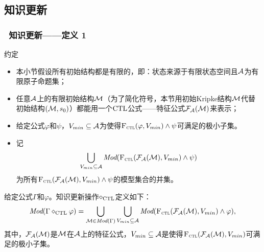 \documentclass[9pt, CJK]{beamer}
\begin{document}
\subsection{知识更新}
\begin{frame}
	\frametitle{~知识更新——{\footnotesize 定义 1}}
	{\footnotesize
		\begin{block}{约定}
			\begin{itemize}
				\item 本小节假设所有初始结构都是有限的，即：状态来源于有限状态空间且${\cal A}$为有限原子命题集；
				\item 任意${\cal A}$上的有限初始结构${\cal M}$（为了简化符号，本节用初始Kripke结构${\cal M}$代替初始结构$({\cal M},s_0)$）都能用一个$\textrm{CTL}$公式——特征公式${\cal F}_{{\cal A}}({\cal M})$来表示；
				\item 给定公式$\varphi$和$\psi$，$V_{min}\subseteq {\cal A}$为使得${\textsc{F}_{\textsc{ctl}}}(\varphi, V_{min}) \wedge \psi$可满足的极小子集。
				\item 记
				$$\bigcup_{V_{min}\subseteq {\cal A}} \textit{Mod}({\textsc{F}_{\textsc{ctl}}}({\cal F}_{{\cal A}}({\cal M}), V_{min}) \wedge \psi)$$  
				为所有${\textsc{F}_{\textsc{ctl}}}({\cal F}_{{\cal A}}({\cal M}), V_{min}) \wedge \psi$的模型集合的并集。
			\end{itemize}
		\end{block}
	
	\begin{definition}\label{def:KU}
		给定公式$\Gamma$和$\varphi$。知识更新操作$\diamond_{\textrm{CTL}}$定义如下：
		\[
		\textit{Mod}(\Gamma \diamond_{\textrm{CTL}} \varphi) = \bigcup_{{\cal M} \in \textit{Mod}(\Gamma)} \bigcup_{V_{min}\subseteq {\cal A}} \textit{Mod}({\textsc{F}_{\textsc{ctl}}}({\cal F}_{{\cal A}}({\cal M}), V_{min}) \wedge \varphi),
		\]
		其中，${\cal F}_{{\cal A}}({\cal M})$是${\cal M}$在${\cal A}$上的特征公式，$V_{min} \subseteq {\cal A}$是使得${\textsc{F}_{\textsc{ctl}}}({\cal F}_{{\cal A}}({\cal M}), V_{min})$可满足的极小子集。
	\end{definition}
	}
\end{frame}
\end{document}
